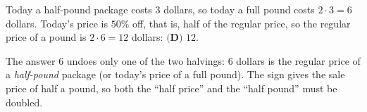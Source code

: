 Today a half-pound package costs $3$ dollars, so today a full pound costs $2\cdot3=6$ dollars. Today's price is $50\%$ off, that is, half of the regular price, so the regular price of a pound is $2\cdot6=12$ dollars: $\boxed{\textbf{(D) }12}$.

The answer $6$ undoes only one of the two halvings: $6$ dollars is the regular price of a \emph{half-pound} package (or today's price of a full pound). The sign gives the sale price of half a pound, so both the ``half price'' and the ``half pound'' must be doubled.
